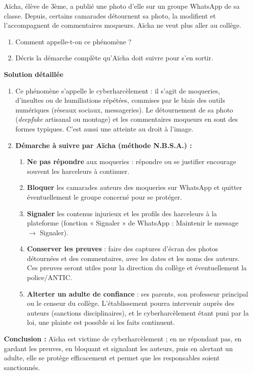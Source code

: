 \documentclass[11pt]{article}
\newcommand{\cle}[1]{{\popxbold\color{popdark}#1}}
\begin{document}
\begin{exoresolu}
Aïcha, élève de 3ème, a publié une photo d'elle sur un groupe WhatsApp de sa classe. Depuis, certains camarades détournent sa photo, la modifient et l'accompagnent de commentaires moqueurs. Aïcha ne veut plus aller au collège.
\begin{enumerate}
\item Comment appelle-t-on ce phénomène ?
\item Décris la démarche complète qu'Aïcha doit suivre pour s'en sortir.
\end{enumerate}
\tcblower
\textbf{Solution détaillée}
\begin{enumerate}
\item Ce phénomène s'appelle le \cle{cyberharcèlement} : il s'agit de moqueries, d'insultes ou de humiliations répétées, commises par le biais des outils numériques (réseaux sociaux, messageries). Le détournement de sa photo (\emph{deepfake} artisanal ou montage) et les commentaires moqueurs en sont des formes typiques. C'est aussi une atteinte au \cle{droit à l'image}.
\item \textbf{Démarche à suivre par Aïcha (méthode N.B.S.A.) :}
\begin{enumerate}
\item \textbf{Ne pas répondre} aux moqueries : répondre ou se justifier encourage souvent les harceleurs à continuer.
\item \textbf{Bloquer} les camarades auteurs des moqueries sur WhatsApp et quitter éventuellement le groupe concerné pour se protéger.
\item \textbf{Signaler} les contenus injurieux et les profils des harceleurs à la plateforme (fonction « Signaler » de WhatsApp : Maintenir le message $\to$ Signaler).
\item \textbf{Conserver les preuves} : faire des captures d'écran des photos détournées et des commentaires, avec les dates et les noms des auteurs. Ces preuves seront utiles pour la direction du collège et éventuellement la police/ANTIC.
\item \textbf{Alterter un adulte de confiance} : ses parents, son professeur principal ou le censeur du collège. L'établissement pourra intervenir auprès des auteurs (sanctions disciplinaires), et le cyberharcèlement étant puni par la loi, une plainte est possible si les faits continuent.
\end{enumerate}
\end{enumerate}
\textbf{Conclusion :} Aïcha est victime de cyberharcèlement ; en ne répondant pas, en gardant les preuves, en bloquant et signalant les auteurs, puis en alertant un adulte, elle se protège efficacement et permet que les responsables soient sanctionnés.
\end{exoresolu}
\end{document}
